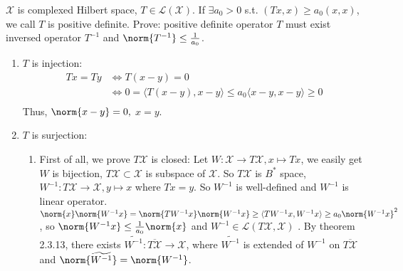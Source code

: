 \documentclass{ctexart}
\newif\ifpreface
\begin{document}
\large
\setlength{\baselineskip}{1.2em}
\ifpreface
    
\else
\maketitle
\fi
{}

\begin{problem}
  \(\mathcal{X}\) is complexed Hilbert space, \(T \in \mathcal{L}(\mathcal{X})\). If \(\exists a_0>0\) s.t. \((Tx,x) \geq a_0(x,x)\), we 
  call \(T\) is positive definite. Prove: positive definite operator \(T\) must exist inversed
  operator \(T^{-1}\) and \(\norm{T^{-1}} \leq \frac{1}{a_0}\).

\end{problem}
\begin{solution}
 \begin{enumerate}
   \item \(T\) is injection: 
     \begin{equation}
     \, \begin{aligned}
       Tx = Ty & \iff T(x-y) = 0 \\
       \,& \iff 0 = \langle T(x-y) , x-y \rangle \leq a_0 \langle x-y , x-y \rangle \geq 0\\ 
     \end{aligned}
     \end{equation}
    Thus, \(\norm{x-y}=0, \) \(x=y\).
  \item \(T\) is surjection:
    \begin{enumerate}
      \item First of all, we prove \(T \mathcal{X}\) is closed: Let \(W : \mathcal{X} \to T \mathcal{X} , x \mapsto Tx\),
        we easily get \(W\) is bijection, \(T \mathcal{X} \subset \mathcal{X}\) is subspace of \(\mathcal{X}\).
        So \(T \mathcal{X}\) is \(B^{*}\) space,
      \(W^{-1} : T \mathcal{X} \to \mathcal{X}, y \mapsto x \) where \(Tx = y \). So 
      \(W^{-1}\) is well-defined and \(W^{-1}\) is linear operator. 
      \(\norm{x} \norm{W^{-1}x} = \norm{T W^{-1} x} \norm{W^{-1} x} \geq \langle T W^{-1} x , W^{-1} x \rangle \geq a_0 \norm{W^{-1} x}^2  \)
      , so \(\norm{W^{-1}x} \leq \frac{1}{a_0}\norm{x}\) and \( W^{-1}\in \mathcal{L} (T \mathcal{X}, \mathcal{X}) \) .
      By theorem 2.3.13, there exists \(\widetilde{W^{-1}} : \overline{T \mathcal{X}} \to \mathcal{X}\),
      where \(\widetilde{W^{-1}}\) is extended of \(W^{-1}\) on \(\overline{T \mathcal{X}}\) and \(\norm{\widetilde{W^{-1}}}=\norm{W^{-1}}\). 

\end{enumerate}
\end{enumerate}
\end{solution}
\end{document}
